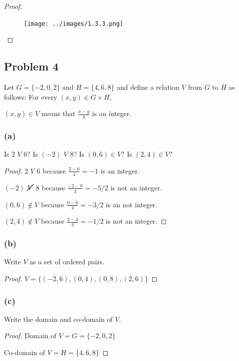 \documentclass[14pt]{extarticle}
\newcommand{\dps}{\displaystyle}
\begin{document}
\begin{proof}
\begin{figure}[ht!]
\centering
\texttt{[image: ../images/1.3.3.png]}
\end{figure}
\end{proof}

\subsection{Problem 4}
Let $G = \{-2, 0, 2\}$ and $H = \{4, 6, 8\}$ and define a relation $V$ from
$G$ to $H$ as follows: For every $(x, y) \in G \times H$,

\begin{center}
$(x, y) \in V$ means that $\dps\frac{x-y}{4}$ is an integer.
\end{center}

\subsubsection{(a)}
Is 2 $V$ 6? Is $(-2)$ $V$ 8? Is $(0, 6) \in V$? Is $(2, 4) \in V$?

\begin{proof}
2 $V$ 6 because $\dps\frac{2-6}{4} = -1$ is an integer.

$(-2)$ $\cancel{V}$ 8 because $\dps\frac{-2-8}{4} = -5/2$ is not an integer.

$(0, 6) \notin V$ because $\dps\frac{0-6}{4} = -3/2$ is an not integer.

$(2, 4) \notin V$ because $\dps\frac{2-4}{4} = -1/2$ is not an integer.

\end{proof}

\subsubsection{(b)}
Write $V$ as a set of ordered pairs.

\begin{proof}
$V = \{(-2, 6), (0, 4), (0, 8), (2, 6)\}$
\end{proof}

\subsubsection{(c)}
Write the domain and co-domain of $V$.

\begin{proof}
Domain of $V = G = \{-2, 0, 2\}$

Co-domain of $V = H = \{4, 6, 8\}$
\end{proof}
\end{document}

